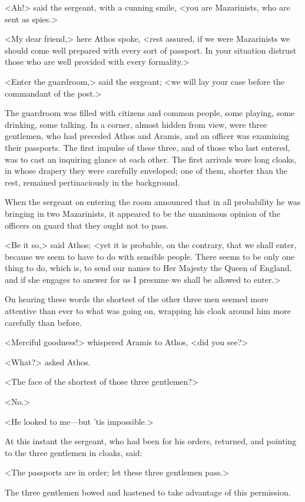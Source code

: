 <Ah!> said the sergeant, with a cunning smile, <you are Mazarinists, who are sent as spies.>

<My dear friend,> here Athos spoke, <rest assured, if we were Mazarinists we should come well prepared with every sort of passport. In your situation distrust those who are well provided with every formality.>

<Enter the guardroom,> said the sergeant; <we will lay your case before the commandant of the post.>

The guardroom was filled with citizens and common people, some playing, some drinking, some talking. In a corner, almost hidden from view, were three gentlemen, who had preceded Athos and Aramis, and an officer was examining their passports. The first impulse of these three, and of those who last entered, was to cast an inquiring glance at each other. The first arrivals wore long cloaks, in whose drapery they were carefully enveloped; one of them, shorter than the rest, remained pertinaciously in the background.

When the sergeant on entering the room announced that in all probability he was bringing in two Mazarinists, it appeared to be the unanimous opinion of the officers on guard that they ought not to pass.

<Be it so,> said Athos; <yet it is probable, on the contrary, that we shall enter, because we seem to have to do with sensible people. There seems to be only one thing to do, which is, to send our names to Her Majesty the Queen of England, and if she engages to answer for us I presume we shall be allowed to enter.>

On hearing these words the shortest of the other three men seemed more attentive than ever to what was going on, wrapping his cloak around him more carefully than before.

<Merciful goodness!> whispered Aramis to Athos, <did you see?>

<What?> asked Athos.

<The face of the shortest of those three gentlemen?>

<No.>

<He looked to me—but 'tis impossible.>

At this instant the sergeant, who had been for his orders, returned, and pointing to the three gentlemen in cloaks, said:

<The passports are in order; let these three gentlemen pass.>

The three gentlemen bowed and hastened to take advantage of this permission.

